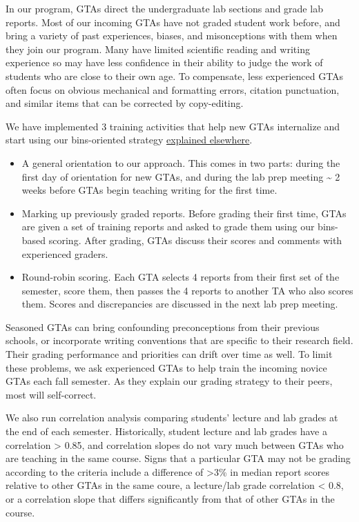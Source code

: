 \documentclass[
]{book}
\providecommand{\tightlist}{%
  \setlength{\itemsep}{0pt}\setlength{\parskip}{0pt}}
\begin{document}
In our program, GTAs direct the undergraduate lab sections and grade lab reports. Most of our incoming GTAs have not graded student work before, and bring a variety of past experiences, biases, and misonceptions with them when they join our program. Many have limited scientific reading and writing experience so may have less confidence in their ability to judge the work of students who are close to their own age. To compensate, less experienced GTAs often focus on obvious mechanical and formatting errors, citation punctuation, and similar items that can be corrected by copy-editing.

We have implemented 3 training activities that help new GTAs internalize and start using our bins-oriented strategy \protect\hyperlink{commenting710}{explained elsewhere}.

\begin{itemize}
\tightlist
\item
  A general orientation to our approach. This comes in two parts: during the first day of orientation for new GTAs, and during the lab prep meeting \textasciitilde{} 2 weeks before GTAs begin teaching writing for the first time.
\item
  Marking up previously graded reports. Before grading their first time, GTAs are given a set of training reports and asked to grade them using our bins-based scoring. After grading, GTAs discuss their scores and comments with experienced graders.
\item
  Round-robin scoring. Each GTA selects 4 reports from their first set of the semester, score them, then passes the 4 reports to another TA who also scores them. Scores and discrepancies are discussed in the next lab prep meeting.
\end{itemize}

Seasoned GTAs can bring confounding preconceptions from their previous schools, or incorporate writing conventions that are specific to their research field. Their grading performance and priorities can drift over time as well. To limit these problems, we ask experienced GTAs to help train the incoming novice GTAs each fall semester. As they explain our grading strategy to their peers, most will self-correct.

We also run correlation analysis comparing students' lecture and lab grades at the end of each semester. Historically, student lecture and lab grades have a correlation \textgreater{} 0.85, and correlation slopes do not vary much between GTAs who are teaching in the same course. Signs that a particular GTA may not be grading according to the criteria include a difference of \textgreater3\% in median report scores relative to other GTAs in the same coure, a lecture/lab grade correlation \textless{} 0.8, or a correlation slope that differs significantly from that of other GTAs in the course.
\end{document}
